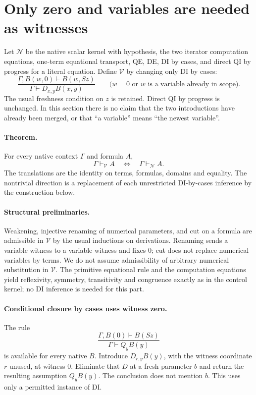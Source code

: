 \section{Only zero and variables are needed as witnesses}
\label{sec:witness-restriction}

Let $\mathcal N$ be the native scalar kernel with hypothesis, the two iterator
computation equations, one-term equational transport, QE, DE, DI by cases, and
direct QI by progress for a literal equation. Define $\mathcal V$ by changing
only DI by cases:
\[
 \frac{\Gamma,B(w,0)\vdash B(w,Sz)}
      {\Gamma\vdash D_{x,y}B(x,y)}
 \qquad
 \bigl(w=0\text{ or }w\text{ is a variable already in scope}\bigr).
\]
The usual freshness condition on $z$ is retained. Direct QI by progress
is unchanged. In this section there is no claim that the two introductions
have already been merged, or that ``a variable'' means ``the newest variable''.

\paragraph{Theorem.}
For every native context $\Gamma$ and formula $A$,
\[
 \boxed{\Gamma\vdash_{\mathcal V} A
        \quad\Longleftrightarrow\quad
        \Gamma\vdash_{\mathcal N} A.}
\]
The translations are the identity on terms, formulas, domains and equality.
The nontrivial direction is a replacement of each unrestricted DI-by-cases
inference by the construction below.

\paragraph{Structural preliminaries.}
Weakening, injective renaming of numerical parameters, and cut on a formula
are admissible in $\mathcal V$ by the usual inductions on derivations.
Renaming sends a variable witness to a variable witness and fixes $0$;
cut does not replace numerical variables by terms. We do not assume
admissibility of arbitrary numerical substitution in $\mathcal V$.
The primitive equational rule and the computation equations yield
reflexivity, symmetry, transitivity and congruence exactly as in the control
kernel; no DI inference is needed for this part.

\paragraph{Conditional closure by cases uses witness zero.}
The rule
\begin{equation}
 \frac{\Gamma,B(0)\vdash B(Sz)}{\Gamma\vdash Q_yB(y)}
 \tag{QC}\label{eq:q-cases-restricted}
\end{equation}
is available for every native $B$. Introduce $D_{r,y}B(y)$, with the
witness coordinate $r$ unused, at witness $0$. Eliminate that $D$ at a fresh
parameter $b$ and return the resulting assumption $Q_yB(y)$. The conclusion
does not mention $b$. This uses only a permitted instance of DI.

